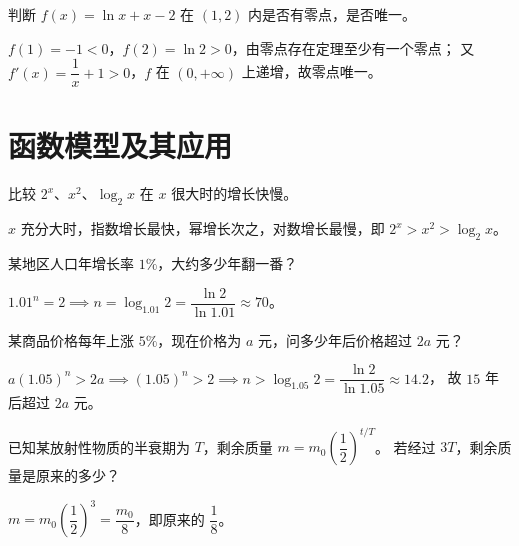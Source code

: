 \begin{problem}
判断 $f(x)=\ln x+x-2$ 在 $(1,2)$ 内是否有零点，是否唯一。
\end{problem}
\begin{solution}
$f(1)=-1<0$，$f(2)=\ln2>0$，由零点存在定理至少有一个零点；
又 $f'(x)=\dfrac1x+1>0$，$f$ 在 $(0,+\infty)$ 上递增，故零点唯一。
\end{solution}

\section{函数模型及其应用}

\begin{problem}
比较 $2^x$、$x^2$、$\log_2 x$ 在 $x$ 很大时的增长快慢。
\end{problem}
\begin{solution}
$x$ 充分大时，指数增长最快，幂增长次之，对数增长最慢，即 $2^x>x^2>\log_2 x$。
\end{solution}

\begin{problem}
某地区人口年增长率 $1\%$，大约多少年翻一番？
\end{problem}
\begin{solution}
$1.01^n=2\implies n=\log_{1.01}2=\dfrac{\ln2}{\ln1.01}\approx70$。
\end{solution}

\begin{problem}
某商品价格每年上涨 $5\%$，现在价格为 $a$ 元，问多少年后价格超过 $2a$ 元？
\end{problem}
\begin{solution}
$a(1.05)^n>2a\implies(1.05)^n>2\implies n>\log_{1.05}2=\dfrac{\ln2}{\ln1.05}\approx14.2$，
故 $15$ 年后超过 $2a$ 元。
\end{solution}

\begin{problem}
已知某放射性物质的半衰期为 $T$，剩余质量 $m=m_0\left(\dfrac12\right)^{t/T}$。
若经过 $3T$，剩余质量是原来的多少？
\end{problem}
\begin{solution}
$m=m_0\left(\dfrac12\right)^3=\dfrac{m_0}{8}$，即原来的 $\dfrac18$。
\end{solution}
